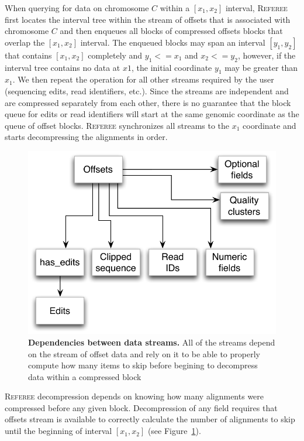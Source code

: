 \documentclass[12pt]{cmuthesis}
\newcommand{\refer}{\textsc{Referee}\xspace}
\begin{document}
  When querying for data on chromosome $C$ within a $[x_1, x_2]$ interval, \refer first locates the interval tree within the stream of offsets that is associated with chromosome $C$ and then enqueues all blocks of compressed offsets blocks that overlap the $[x_1, x_2]$ interval. The enqueued blocks may span an interval $[y_1, y_2]$ that contains $[x_1, x_2]$ completely and  $y_1 <= x_1$ and $x_2 <= y_2$, however, if the interval tree contains no data at $x1$, the initial coordinate $y_1$ may be greater than $x_1$. We then repeat the operation for all other streams required by the user (sequencing edits, read identifiers, etc.). Since the streams are independent and are compressed separately from each other, there is no guarantee that the block queue for edits or read identifiers will start at the same genomic coordinate as the queue of offset blocks. \refer synchronizes all streams to the $x_1$ coordinate and starts decompressing the alignments in order.


  \begin{figure}[ht]
    \centering
    \includegraphics[width=0.6\linewidth]{figures/streams_dependency}
    \caption{\textbf{Dependencies between data streams.} All of the streams depend on the stream of offset data and rely on it to be able to properly compute how many items to skip before begining to decompress data within a compressed block}
    \label{fig:referee:stream_depend}
  \end{figure}


  \refer decompression depends on knowing how many alignments were compressed before any given block. Decompression of any field requires that offsets stream is available to correctly calculate the number of alignments to skip until the beginning of interval $[x_1, x_2]$ (see Figure~\ref{fig:referee:stream_depend}).
\end{document}

